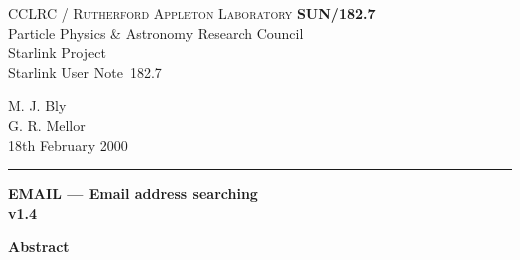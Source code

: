\documentclass[twoside,11pt]{article}
\newcommand{\stardoccategory}  {Starlink User Note}
\newcommand{\stardocinitials}  {SUN}
\newcommand{\stardocnumber}    {182.7}
\newcommand{\stardocauthors}   {M. J. Bly \\G. R. Mellor}
\newcommand{\stardocdate}      {18th February 2000}
\newcommand{\stardoctitle}     {EMAIL --- Email address searching}
\newcommand{\stardocversion}   {v1.4}
\newcommand{\stardocname}{\stardocinitials /\stardocnumber}
\newenvironment{latexonly}{}{}
\renewcommand{\_}{\texttt{\symbol{95}}}
\begin{document}
\thispagestyle{empty}

\begin{latexonly}
   CCLRC / \textsc{Rutherford Appleton Laboratory} \hfill \textbf{\stardocname}\\
   {\large Particle Physics \& Astronomy Research Council}\\
   {\large Starlink Project\\}
   {\large \stardoccategory\ \stardocnumber}
   \begin{flushright}
   \stardocauthors\\
   \stardocdate
   \end{flushright}
   \vspace{-4mm}
   \rule{\textwidth}{0.5mm}
   \vspace{5mm}
   \begin{center}
   {\Huge\textbf{\stardoctitle \\ [2.5ex]}}
   {\LARGE\textbf{\stardocversion \\ [4ex]}}
   \end{center}
   \vspace{5mm}


   \vspace{10mm}
   \begin{center}
      {\Large\textbf{Abstract}}
   \end{center}
\end{latexonly}
\end{document}
